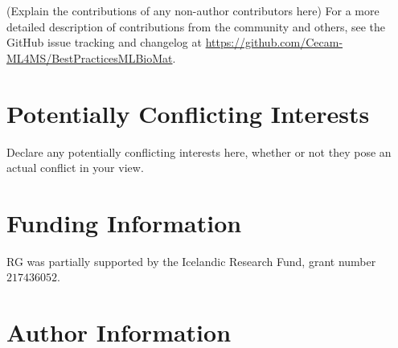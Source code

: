\documentclass[9pt,bestpractices]{livecoms}
\newcommand{\githubrepository}{\url{https://github.com/Cecam-ML4MS/BestPracticesMLBioMat}}  %
\begin{document}
(Explain the contributions of any non-author contributors here)
For a more detailed description of contributions from the community and others, see the GitHub issue tracking and changelog at \githubrepository.

\section*{Potentially Conflicting Interests}

Declare any potentially conflicting interests here, whether or not they pose an actual conflict in your view.

\section*{Funding Information}
RG was partially supported by the Icelandic Research Fund, grant number
$217436052$. 

\section*{Author Information}
\makeorcid




\end{document}
